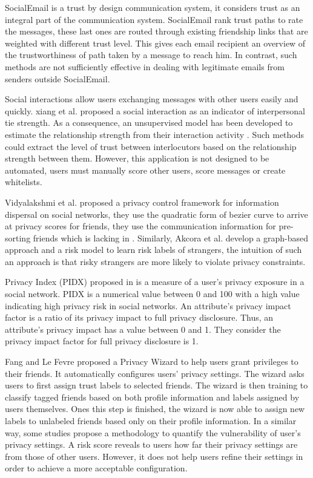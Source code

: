 SocialEmail \cite{tran_social_2010} is a trust by design communication system,
	it considers trust as an integral part of the communication system.
SocialEmail rank trust paths to rate the messages,
	these last ones are routed through existing friendship links that are weighted with different trust level.
This gives each email recipient an overview of the trustworthiness of path taken by a message to reach him.
In contrast,
	such methods are not sufficiently effective in dealing with legitimate emails from senders outside SocialEmail.

Social interactions allow users exchanging messages with other users easily and quickly.
	xiang et al. \cite{xiang_modeling_2010} proposed a social interaction as an indicator of interpersonal tie strength.
As a consequence,
	an unsupervised model has been developed to estimate the relationship strength from their interaction activity \cite{xiang_modeling_2010}.
Such methods could extract the level of trust between interlocutors based on the relationship strength between them.
However,
	this application is not designed to be automated,
	users must manually score other users, score messages or create whitelists.

Vidyalakshmi et al. \cite{b.s._privacy_2015} proposed a privacy control framework for information dispersal on social networks,
	they use the quadratic form of bezier curve to arrive at privacy scores for friends,
	they use the communication information for pre-sorting friends which is lacking in \cite{vidyalakshmi_privacy_2015}.
Similarly,
	Akcora et al. \cite{akcora_risks_2012} develop a graph-based approach and a risk model to learn risk labels of strangers,
	the intuition of such an approach is that risky strangers are more likely to violate privacy constraints.

Privacy Index (PIDX) proposed in \cite{nepali_sonet_2013} is a measure of a user’s privacy exposure in a social network.
PIDX is a numerical value between 0 and 100 with a high value indicating high privacy risk in social networks.
An attribute’s privacy impact factor is a ratio of its privacy impact to full privacy disclosure.
Thus,
	an attribute’s privacy impact has a value between 0 and 1.
They consider the privacy impact factor for full privacy disclosure is 1.

Fang and Le Fevre \cite{fang_privacy_2010} proposed a Privacy Wizard to help users grant privileges to their friends.
It automatically configures users' privacy settings.
The wizard asks users to first assign trust labels to selected friends.
The wizard is then training to classify tagged friends based on both profile information and labels assigned by users themselves.
Ones this step is finished,
	the wizard is now able to assign new labels to unlabeled friends based only on their profile information.
In a similar way,
	some studies \cite{maximilien_privacyasaservice_2009} propose a methodology to quantify the vulnerability of user’s privacy settings.
A risk score reveals to users how far their privacy settings are from those of other users.
However,
	it does not help users refine their settings in order to achieve a more acceptable configuration.

